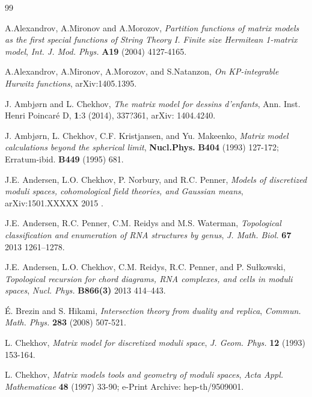 \documentclass[11pt]{article}
\def\appendix#1{
\addtocounter{section}{1} \setcounter{equation}{0}
\renewcommand{\thesection}{\Alph{section}}
\section*{Appendix \thesection\protect\indent\quad
#1}
}
\def\<{\langle}
\def\>{\rangle}
\theoremstyle{plain}
\theoremstyle{definition}
\begin{document}


\begin{thebibliography}{99}

\footnotesize\itemsep=0pt

A.Alexandrov, A.Mironov and A.Morozov, {\it Partition functions of matrix models as the first special functions of String Theory I. Finite size Hermitean 1-matrix model}, {\sl Int. J. Mod. Phys.} {\bf A19} (2004) 4127-4165.

A.Alexandrov, A.Mironov, A.Morozov, and S.Natanzon, {\it On KP-integrable Hurwitz functions}, arXiv:1405.1395.

 J. Ambj{\o}rn and L. Chekhov, {\it The matrix model for dessins d'enfants}, Ann. Inst. Henri Poincar\'e D, {\bf1}:3 (2014), 337?361, arXiv: 1404.4240.

 J. Ambj{\o}rn, L. Chekhov, C.F. Kristjansen, and Yu. Makeenko,
{\it Matrix model calculations beyond the spherical limit},
{\bf Nucl.Phys.} {\bf B404} (1993) 127-172; Erratum-ibid. {\bf B449} (1995) 681.

J.E. Andersen, L.O. Chekhov, P. Norbury, and R.C. Penner,
{\it Models of discretized moduli spaces, cohomological field theories, and Gaussian means},  arXiv:1501.XXXXX 2015 .



 J.E. Andersen,  R.C. Penner, C.M. Reidys and M.S. Waterman,
{\it Topological classification and enumeration of RNA structures by genus}, {\sl J. Math. Biol.} {\bf 67} 2013 1261--1278.

 J.E. Andersen, L.O. Chekhov, C.M. Reidys, R.C. Penner, and P. Su{\l}kowski,
{\it Topological recursion for chord diagrams, RNA complexes, and cells in moduli spaces}, {\sl Nucl. Phys.} {\bf B866(3)} 2013 414--443.

 \'E. Brezin and S. Hikami, {\it Intersection theory from duality and replica},
{\sl Commun. Math. Phys.} {\bf 283} (2008) 507-521.

 L. Chekhov, {\it Matrix model for discretized moduli space},
{\sl J. Geom. Phys.} {\bf12} (1993) 153-164.

 L. Chekhov, {\it Matrix models tools and geometry of moduli spaces},
{\sl Acta Appl. Mathematicae} {\bf 48} (1997) 33-90; e-Print Archive:
hep-th/9509001.


\end{thebibliography}
\end{document}
